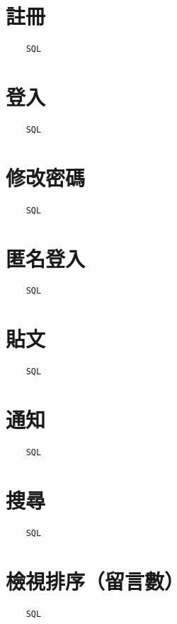 \documentclass[12pt,a4paper]{article}
\begin{document}
\section*{註冊}
\begin{lstlisting}
    SQL
\end{lstlisting}

\section*{登入}
\begin{lstlisting}
    SQL
\end{lstlisting}

\section*{修改密碼}
\begin{lstlisting}
    SQL
\end{lstlisting}

\section*{匿名登入}
\begin{lstlisting}
    SQL
\end{lstlisting}

\section*{貼文}
\begin{lstlisting}
    SQL
\end{lstlisting}

\section*{通知}
\begin{lstlisting}
    SQL
\end{lstlisting}

\section*{搜尋}
\begin{lstlisting}
    SQL
\end{lstlisting}

\section*{檢視排序（留言數）}
\begin{lstlisting}
    SQL
\end{lstlisting}
\end{document}
